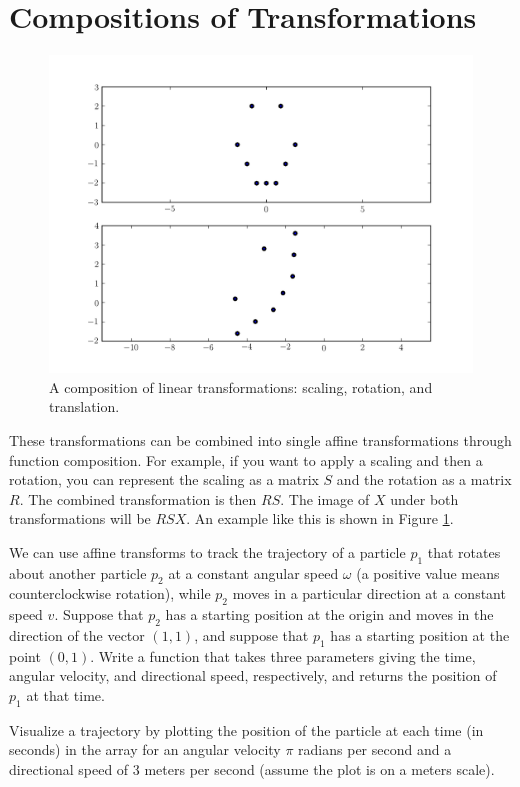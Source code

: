 \section*{Compositions of Transformations}
\begin{figure}
\centering
\includegraphics[width=\textwidth]{combo.pdf}
\caption{
A composition of linear transformations: scaling, rotation, and translation.}
\label{basis:combo}
\end{figure}
These transformations can be combined into single affine transformations through function composition.
For example, if you want to apply a scaling and then a rotation, you can represent the
scaling as a matrix $S$ and the rotation as a matrix $R$. The combined transformation is then $RS$.
The image of $X$ under both transformations will be $RSX$.
An example like this is shown in Figure \ref{basis:combo}.

\begin{problem}
We can use affine transforms to track the trajectory of a particle $p_1$ that rotates about
another particle $p_2$ at a constant angular speed $\omega$ (a positive value means
counterclockwise rotation), while $p_2$ moves in a particular
direction at a constant speed $v$. Suppose that $p_2$ has a starting position at the origin and
moves in the direction of the vector $(1, 1)$, and suppose that $p_1$ has a starting position
at the point $(0,1)$. Write a function that takes three parameters giving the time, angular
velocity, and directional speed, respectively, and returns the position of $p_1$ at that time.

Visualize a trajectory by plotting the position of the particle at each time (in seconds) in the array
 for an angular velocity $\pi$ radians per second and a
directional speed of 3 meters per second (assume the plot is on a meters scale).
\end{problem}

